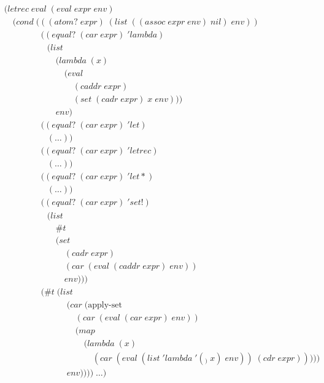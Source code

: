 \begin{figure}[htp]
\footnotesize
\caption{}\label{fig:monadicEval}
\begin{align*}
& (letrec \; eval \; (eval \; expr \; env)
\\& \quad (cond \; (((atom? \; expr) \; (list \; ((assoc \; expr \; env) \; nil) \; env))
\\& \qquad \qquad \; ((equal? \; (car \; expr) \; 'lambda) \; 
\\& \qquad \qquad \quad (list
\\& \qquad \qquad \qquad (lambda \; (x) \; 
\\& \qquad \qquad \qquad \quad (eval \; 
\\& \qquad \qquad \qquad \qquad (caddr \; expr) \; 
\\& \qquad \qquad \qquad \qquad (set \; (cadr \; expr) \; x \; env)))
\\& \qquad \qquad \qquad env)
\\& \qquad \qquad \; ((equal? \; (car \; expr) \; 'let)
\\& \qquad \qquad \quad (\dots))
\\& \qquad \qquad \; ((equal? \; (car \; expr) \; 'letrec)
\\& \qquad \qquad \quad (\dots))
\\& \qquad \qquad \; ((equal? \; (car \; expr) \; 'let*) \; 
\\& \qquad \qquad \quad (\dots))
\\& \qquad \qquad \; ((equal? \; (car \; expr) \; 'set!)
\\& \qquad \qquad \quad (list \; 
\\& \qquad \qquad \qquad \#t \; 
\\& \qquad \qquad \qquad (set \; 
\\& \qquad \qquad \qquad \quad (cadr \; expr) \; 
\\& \qquad \qquad \qquad \quad (car \; (eval \; (caddr \; expr) \; env)) \; 
\\& \qquad \qquad \qquad \quad env)))
\\& \qquad \qquad \; (\#t \; (list
\\& \qquad \qquad \qquad \quad \; (car \; (\text{apply-set} \; 
\\& \qquad \qquad \qquad \qquad \; (car \; (eval \; (car \; expr) \; env))
\\& \qquad \qquad \qquad \qquad \; (map \; 
\\& \qquad \qquad \qquad \qquad \quad \; (lambda \; (x) \; 
\\& \qquad \qquad \qquad \qquad \qquad \; (car \; (eval \; (list \; 'lambda \; '(_) \; x) \; env)) \; (cdr \; expr)))))
\\& \qquad \qquad \qquad \quad \; env)))) \; \dots)
\end{align*}
\end{figure}

